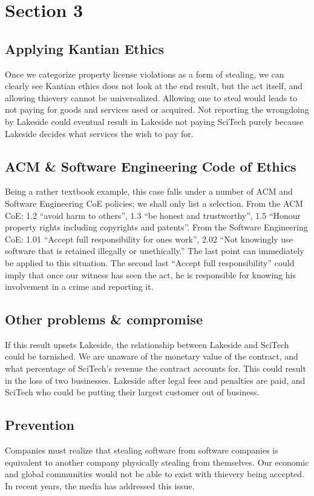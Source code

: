 \section{Section 3}
\subsection{Applying Kantian Ethics}
Once we categorize property license violations as a form of stealing, we can clearly see Kantian ethics does not look at the end result, but the act itself, and allowing thievery cannot be universalized. Allowing one to steal would leads to not paying for goods and services used or acquired. Not reporting the wrongdoing by Lakeside could eventual result in Lakeside not paying SciTech purely because Lakeside decides what services the wish to pay for.  
\subsection{ACM \& Software Engineering Code of Ethics}
Being a rather textbook example, this case falls under a number of ACM and Software Engineering CoE policies; we shall only list a selection. From the ACM CoE: 1.2 ``avoid harm to others'', 1.3 ``be honest and trustworthy'', 1.5 ``Honour property rights including copyrights and patents''. From the Software Engineering CoE: 1.01 ``Accept full responsibility for ones work'', 2.02 ``Not knowingly use software that is retained illegally or unethically.'' The last point can immediately be applied to this situation. The second last ``Accept full responsibility'' could imply that once our witness has seen the act, he is responsible for knowing his involvement in a crime and reporting it.
\subsection{Other problems \& compromise} 
If this result upsets Lakeside, the relationship between Lakeside and SciTech could be tarnished. We are unaware of the monetary value of the contract, and what percentage of SciTech’s revenue the contract accounts for. This could result in the loss of two businesses. Lakeside after legal fees and penalties are paid, and SciTech who could be putting their largest customer out of business.
\subsection{Prevention}
Companies must realize that stealing software from software companies is equivalent to another company physically stealing from themselves. Our economic and global communities would not be able to exist with thievery being accepted. In recent years, the media has addressed this issue.
